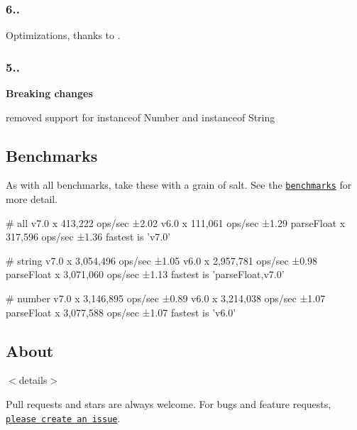 \subsubsection*{6..}


\begin{DoxyItemize}
\item Optimizations, thanks to .
\end{DoxyItemize}

\subsubsection*{5..}

{\bfseries Breaking changes}


\begin{DoxyItemize}
\item removed support for {\ttfamily instanceof Number} and {\ttfamily instanceof String}
\end{DoxyItemize}

\subsection*{Benchmarks}

As with all benchmarks, take these with a grain of salt. See the \href{./benchmark/index.js}{\tt benchmarks} for more detail.


\begin{DoxyCode}
# all
v7.0 x 413,222 ops/sec ±2.02%
v6.0 x 111,061 ops/sec ±1.29%
parseFloat x 317,596 ops/sec ±1.36%
fastest is 'v7.0'

# string
v7.0 x 3,054,496 ops/sec ±1.05%
v6.0 x 2,957,781 ops/sec ±0.98%
parseFloat x 3,071,060 ops/sec ±1.13%
fastest is 'parseFloat,v7.0'

# number
v7.0 x 3,146,895 ops/sec ±0.89%
v6.0 x 3,214,038 ops/sec ±1.07%
parseFloat x 3,077,588 ops/sec ±1.07%
fastest is 'v6.0'
\end{DoxyCode}


\subsection*{About}

$<$details$>$

Pull requests and stars are always welcome. For bugs and feature requests, \href{../../issues/new}{\tt please create an issue}.

